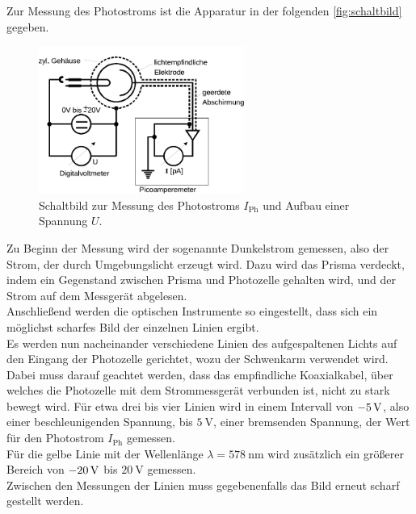     Zur Messung des Photostroms ist die Apparatur in der folgenden \autoref{fig:schaltbild} gegeben.

    \begin{figure}[H]
        \centering
        \includegraphics[width=0.6\textwidth]{content/img/Abb_4.pdf}
        \caption{Schaltbild zur Messung des Photostroms $I_\text{Ph}$ und Aufbau einer Spannung $U$. \cite{versuchsanleitung}}
        \label{fig:schaltbild}
    \end{figure}

    \label{sec:durchfuehrung:dunkelstrom}
    Zu Beginn der Messung wird der sogenannte Dunkelstrom gemessen,
    also der Strom,
    der durch Umgebungslicht erzeugt wird.
    Dazu wird das Prisma verdeckt,
    indem ein Gegenstand zwischen Prisma und Photozelle gehalten wird,
    und der Strom auf dem Messgerät abgelesen.\\
    Anschließend werden die optischen Instrumente so eingestellt,
    dass sich ein möglichst scharfes Bild der einzelnen Linien ergibt.
    \\
    Es werden nun nacheinander verschiedene Linien des aufgespaltenen Lichts auf den Eingang der Photozelle gerichtet,
    wozu der Schwenkarm verwendet wird.
    Dabei muss darauf geachtet werden,
    dass das empfindliche Koaxialkabel,
    über welches die Photozelle mit dem Strommessgerät verbunden ist,
    nicht zu stark bewegt wird.
    Für etwa drei bis vier Linien wird in einem Intervall von $\SI{- 5}{\volt}$,
    also einer beschleunigenden Spannung,
    bis $\SI{5}{\volt}$,
    einer bremsenden Spannung,
    der Wert für den Photostrom $I_\text{Ph}$ gemessen.
    \\
    Für die gelbe Linie mit der Wellenlänge $\lambda = \SI{578}{\nano\meter}$
    wird zusätzlich ein größerer Bereich von
    $\SI{- 20}{\volt}$ bis $\SI{20}{\volt}$ gemessen.\\
    Zwischen den Messungen der Linien muss gegebenenfalls das Bild erneut scharf gestellt werden.
